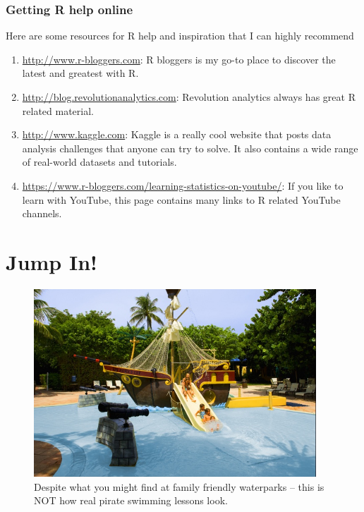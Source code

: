 \documentclass[]{book}
\theoremstyle{definition}
\theoremstyle{definition}
\theoremstyle{remark}
\begin{document}
\subsection{Getting R help online}\label{getting-r-help-online}

Here are some resources for R help and inspiration that I can highly
recommend

\begin{enumerate}
\def\labelenumi{\arabic{enumi}.}
\item
  \url{http://www.r-bloggers.com}: R bloggers is my go-to place to
  discover the latest and greatest with R.
\item
  \url{http://blog.revolutionanalytics.com}: Revolution analytics always
  has great R related material.
\item
  \url{http://www.kaggle.com}: Kaggle is a really cool website that
  posts data analysis challenges that anyone can try to solve. It also
  contains a wide range of real-world datasets and tutorials.
\item
  \url{https://www.r-bloggers.com/learning-statistics-on-youtube/}: If
  you like to learn with YouTube, this page contains many links to R
  related YouTube channels.
\end{enumerate}

\chapter{Jump In!}\label{jumpin}

\begin{figure}

{\centering \includegraphics[width=400px]{images/pirateswimming} 

}

\caption{Despite what you might find at family friendly waterparks -- this is NOT how real pirate swimming lessons look.}\label{fig:unnamed-chunk-18}
\end{figure}
\end{document}
